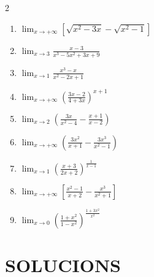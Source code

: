 \documentclass[12pt,a4paper]{article}
\begin{document}
\begin{multicols}{2}
\begin{enumerate}[label=7.\arabic*.]
    \item $\displaystyle \lim_{x \to +\infty}
          \left[\sqrt{x^2-3x}-\sqrt{x^2-1}\right]$
          

    \item $\displaystyle \lim_{x \to 3}
          \frac{x-3}{x^3-5x^2+3x+9}$
          

    \item $\displaystyle \lim_{x \to 1}
          \frac{x^3-x}{x^2-2x+1}$
          

    \item $\displaystyle \lim_{x \to +\infty}
          \left(\frac{3x-2}{4+3x}\right)^{\!x+1}$
          

    \item $\displaystyle \lim_{x \to 2}
          \left(\frac{3x}{x^2-4}-\frac{x+1}{x-2}\right)$
          

    \item $\displaystyle \lim_{x \to +\infty}
          \left(\frac{3x^2}{x+1}-\frac{3x^3}{x^2-1}\right)$
          

    \item $\displaystyle \lim_{x \to 1}
          \left(\frac{x+3}{2x+2}\right)^{\!\frac{1}{x-1}}$
          

    \item $\displaystyle \lim_{x \to +\infty}
          \left[\frac{x^2-1}{x+2}-\frac{x^3}{x^2+1}\right]$
          

    \item $\displaystyle \lim_{x \to 0}
          \left(\frac{1+x^2}{1-x^2}\right)^{\!\frac{1+3x^2}{x^2}}$
          
\end{enumerate}
\end{multicols}

\newpage

\section*{SOLUCIONS}
\end{document}

